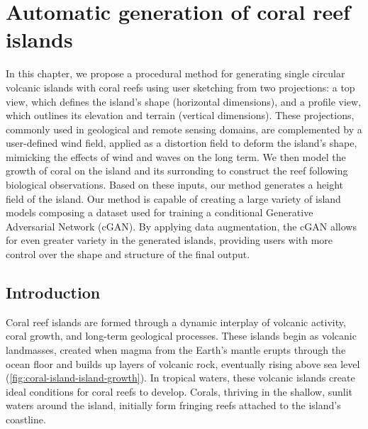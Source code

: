 \resetgraphicspath
{}


\chapter{Automatic generation of coral reef islands}
\label{chap:coral-island}

\abstract 
In this chapter, we propose a procedural method for generating single circular volcanic islands with coral reefs using user sketching from two projections: a top view, which defines the island's shape (horizontal dimensions), and a profile view, which outlines its elevation and terrain (vertical dimensions). These projections, commonly used in geological and remote sensing domains, are complemented by a user-defined wind field, applied as a distortion field to deform the island's shape, mimicking the effects of wind and waves on the long term. We then model the growth of coral on the island and its surronding to construct the reef following biological observations. Based on these inputs, our method generates a height field of the island. Our method is capable of creating a large variety of island models composing a dataset used for training a conditional Generative Adversarial Network (cGAN). By applying data augmentation, the cGAN allows for even greater variety in the generated islands, providing users with more control over the shape and structure of the final output.
\pagebreak 

\minitoc

\section{Introduction}
\label{sec:coral-island-introduction}

Coral reef islands are formed through a dynamic interplay of volcanic activity, coral growth, and long-term geological processes. These islands begin as volcanic landmasses, created when magma from the Earth's mantle erupts through the ocean floor and builds up layers of volcanic rock, eventually rising above sea level (\cref{fig:coral-island-island-growth}). In tropical waters, these volcanic islands create ideal conditions for coral reefs to develop. Corals, thriving in the shallow, sunlit waters around the island, initially form fringing reefs attached to the island's coastline.

